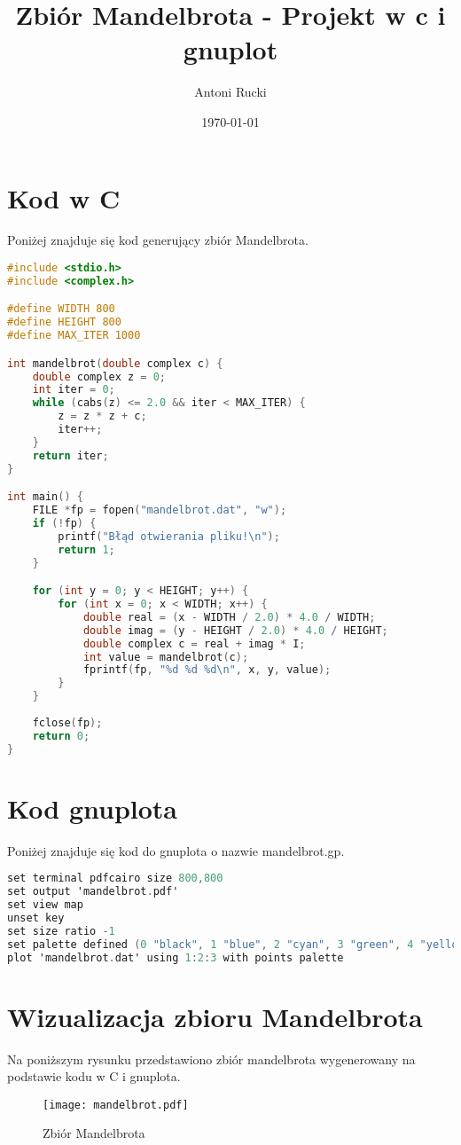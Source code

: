 \documentclass{article}
\title{Zbiór Mandelbrota - Projekt w c i gnuplot}
\author{Antoni Rucki}
\date{\today}
\begin{document}
\maketitle
\tableofcontents
\newpage{}
\section{Kod w C}
Poniżej znajduje się kod generujący zbiór Mandelbrota.



\begin{lstlisting}[language=C, caption=Kod programu Mandelbrota]
#include <stdio.h>
#include <complex.h>

#define WIDTH 800
#define HEIGHT 800
#define MAX_ITER 1000

int mandelbrot(double complex c) {
    double complex z = 0;
    int iter = 0;
    while (cabs(z) <= 2.0 && iter < MAX_ITER) {
        z = z * z + c;
        iter++;
    }
    return iter;
}

int main() {
    FILE *fp = fopen("mandelbrot.dat", "w");
    if (!fp) {
        printf("Błąd otwierania pliku!\n");
        return 1;
    }

    for (int y = 0; y < HEIGHT; y++) {
        for (int x = 0; x < WIDTH; x++) {
            double real = (x - WIDTH / 2.0) * 4.0 / WIDTH;
            double imag = (y - HEIGHT / 2.0) * 4.0 / HEIGHT;
            double complex c = real + imag * I;
            int value = mandelbrot(c);
            fprintf(fp, "%d %d %d\n", x, y, value);
        }
    }
    
    fclose(fp);
    return 0;
}

\end{lstlisting}
\newpage{}
\section{Kod gnuplota}
Poniżej znajduje się kod do gnuplota o nazwie mandelbrot.gp.
\begin{lstlisting}[language=C, caption=Kod gnuplota]
set terminal pdfcairo size 800,800
set output 'mandelbrot.pdf'
set view map
unset key
set size ratio -1
set palette defined (0 "black", 1 "blue", 2 "cyan", 3 "green", 4 "yellow", 5 "red", 6 "white")
plot 'mandelbrot.dat' using 1:2:3 with points palette


\end{lstlisting}
\newpage{}
\section{Wizualizacja zbioru Mandelbrota}
Na poniższym rysunku przedstawiono zbiór mandelbrota wygenerowany na podstawie kodu w C i gnuplota.

\begin{figure}[h]
    \centering
    \texttt{[image: mandelbrot.pdf]}
    \caption{Zbiór Mandelbrota}
    \label{fig:mandelbrot}
\end{figure}
\end{document}
